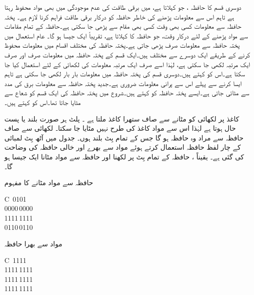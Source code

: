 دوسری قسم کا حافظہ ، جو  کہلاتا ہے،  میں برقی طاقت کی عدم موجودگی میں بھی   مواد محفوظ رہتا ہے تاہم اس سے  معلومات پڑھنے کی خاطر حافظہ کو درکار برقی طاقت فراہم کرنا لازم   ہے۔ پختہ حافظہ سے معلومات کسی بھی وقت کسی بھی  مقام سے پڑھی جا سکتی ہے۔حافظہ کے تمام مقامات سے مواد پڑھنے کے لئے درکار وقت، جو حافظہ کا کہلاتا ہے،  تقریباً ایک جیسا ہو گا۔ عام استعمال میں پختہ حافظہ سے معلومات صرف پڑھی جاتی ہے۔پختہ حافظہ کی مختلف اقسام میں معلومات محفوظ کرنے کے طریقے ایک دوسرے سے  مختلف ہیں۔ایک قسم  کے پختہ حافظہ میں معلومات صرف اور صرف ایک مرتبہ لکھی جا سکتی ہے، لہٰذا اسے صرف ایک مرتبہ معلومات کی لکھائی کے لئے استعمال کیا جا سکتا ہے۔اس کو   کہتے ہیں۔دوسری قسم کی پختہ حافظہ میں معلومات  بار بار لکھی  جا سکتی ہے تاہم ایسا کرنے سے پہلے اس  سے پرانی معلومات ضروری ہے۔جدید پختہ حافظہ سے معلومات  برق  کی مدد سے مٹائی  جاتی ہے۔ایسے پختہ حافظہ کو  کہتے ہیں۔شروع میں پختہ حافظہ کی ایک قسم کو شعاع  سے مٹایا جاتا تھا۔اس کو  کہتے ہیں۔

کاغذ پر لکھائی  کو مٹانے سے صاف ستھرا کاغذ ملتا ہے ۔   پلٹ ہر صورت بلند یا پست حال ہوتا ہے لہٰذا اس سے مواد  کاغذ کی طرح  نہیں مٹایا جا سکتا۔  لکھائی سے صاف حافظہ سے مراد وہ حافظہ ہو گا جس کے تمام بِٹ بلند  ہوں۔  جدول  میں  آٹھ بِٹ لمبائی کے چار  لفظ  حافظہ  استعمال کرتے  ہوئے مواد سے بھرے اور خالی حافظہ  کی وضاحت کی گئی ہے۔ یقیناً ، حافظہ کے تمام بِٹ پر  لکھنا اور حافظہ سے مواد مٹانا   ایک جیسا ہو گا۔
\begin{table}
\caption{حافظہ سے مواد مٹانے کا  مفہوم}
\label{جدول_حافظہ_خالی}
\centering
\begin{subtable}[t]{0.48\textwidth}
\centering
\begin{tabular}{C}
\,0101\\
0000\,0000\\
1111\,1111\\
0110\,0110\\
\bottomrule
\end{tabular}
\caption{مواد سے بھرا حافظہ}
\end{subtable}%
\begin{subtable}[t]{0.48\textwidth}
\centering
\begin{tabular}{C}
\,1111\\
1111\,1111\\
1111\,1111\\
1111\,1111\\
\bottomrule
\end{tabular}
\caption{مواد سے خالی حافظہ}
\end{subtable}
\end{table}


